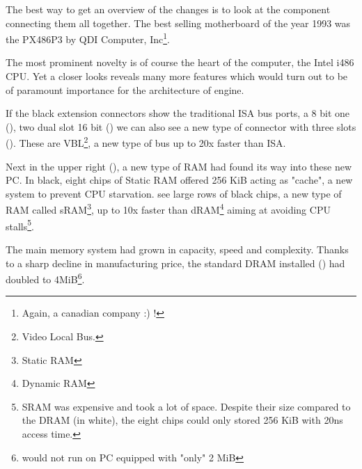 
















\cleartoleftpage
 
The best way to get an overview of the changes is to look at the component connecting them all together. The best selling motherboard of the year 1993 was the PX486P3 by QDI Computer, Inc\footnote{Again, a canadian company :) !}.\\

\par
The most prominent novelty is of course the heart of the computer, the Intel i486 CPU. Yet a closer looks reveals many more features which would turn out to be of paramount importance for the architecture of \doom engine.\\
\par 
If the black extension connectors show the traditional ISA bus ports, a 8 bit one (), two dual slot 16 bit () we can also see a new type of connector with three slots (). These are VBL\footnote{Video Local Bus.}, a new type of bus up to 20x faster than ISA.

\par
 Next in the upper right (), a new type of RAM had found its way into these new PC. In black, eight chips of Static RAM offered 256 KiB acting as "cache", a new system to prevent CPU starvation. see large rows of black chips, a new type of RAM called sRAM\footnote{Static RAM}, up to 10x faster than dRAM\footnote{Dynamic RAM} aiming at avoiding CPU stalls\footnote{SRAM was expensive and took a lot of space. Despite their size compared to the DRAM (in white), the eight chips could only stored 256 KiB with 20ns access time.}. \\
\par
The main memory system had grown in capacity, speed and complexity. Thanks to a sharp decline in manufacturing price, the standard DRAM installed () had doubled to 4MiB\footnote{\doom would not run on PC equipped with "only" 2 MiB}.\\
\par

